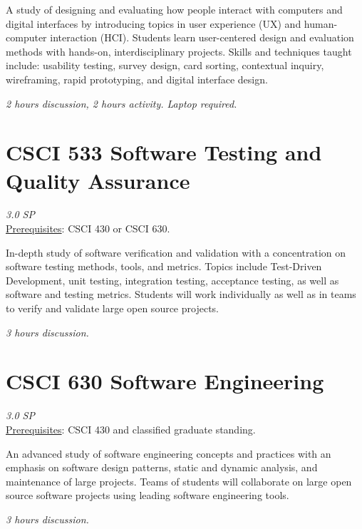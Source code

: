 \documentclass[12pt]{article}
\begin{document}
  A study of designing and evaluating how people interact with computers and digital interfaces by introducing topics in user experience (UX) and human-computer interaction (HCI). Students learn user-centered design and evaluation methods with hands-on, interdisciplinary projects. Skills and techniques taught include: usability testing, survey design, card sorting, contextual inquiry, wireframing, rapid prototyping, and digital interface design.

  \textit{2 hours discussion, 2 hours activity. Laptop required.}

  \section*{CSCI 533 Software Testing and Quality Assurance}
  \textit{3.0 SP} \\
  \underline{Prerequisites}: CSCI 430 or CSCI 630.

   In-depth study of software verification and validation with a concentration on software testing methods, tools, and metrics. Topics include Test-Driven Development, unit testing, integration testing, acceptance testing, as well as software and testing metrics. Students will work individually as well as in teams to verify and validate large open source projects.

  \textit{3 hours discussion.}

  \section*{CSCI 630 Software Engineering}
  \textit{3.0 SP} \\
  \underline{Prerequisites}: CSCI 430 and classified graduate standing.

   An advanced study of software engineering concepts and practices with an emphasis on software design patterns, static and dynamic analysis, and maintenance of large projects. Teams of students will collaborate on large open source software projects using leading software engineering tools. 

   \textit{3 hours discussion.}
  
\end{document}
